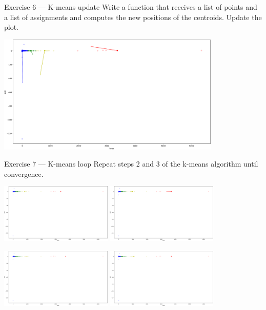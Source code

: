 \documentclass[aspectratio=169,]{beamer}
\begin{document}
\begin{frame}{Exercise 6 --- K-means update}
    Write a function that receives a list of points and a list of assignments and computes the new positions of the
    centroids. Update the plot.

    \includegraphics[width=0.8\textwidth]{./kmeans-update.png}
\end{frame}

\begin{frame}{Exercise 7 --- K-means loop}
    Repeat steps 2 and 3 of the k-means algorithm until convergence.

    \includegraphics[width=0.4\textwidth]{./kmeans-loop1.png}
    \includegraphics[width=0.4\textwidth]{./kmeans-loop2.png}

    \includegraphics[width=0.4\textwidth]{./kmeans-loop3.png}
    \includegraphics[width=0.4\textwidth]{./kmeans-loop4.png}
\end{frame}
\end{document}
